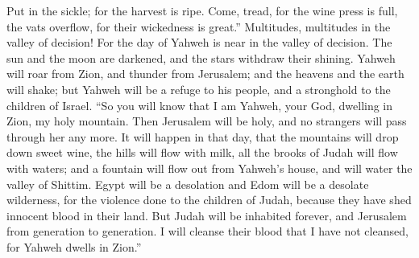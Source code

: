 Put in the sickle; for the harvest is ripe. Come, tread, for the wine
press is full, the vats overflow, for their wickedness is great.''
 Multitudes, multitudes in the valley of decision! For the
day of Yahweh is near in the valley of decision.  The sun
and the moon are darkened, and the stars withdraw their shining.
 Yahweh will roar from Zion, and thunder from Jerusalem;
and the heavens and the earth will shake; but Yahweh will be a refuge to
his people, and a stronghold to the children of Israel. 
``So you will know that I am Yahweh, your God, dwelling in Zion, my holy
mountain. Then Jerusalem will be holy, and no strangers will pass
through her any more.  It will happen in that day, that the
mountains will drop down sweet wine, the hills will flow with milk, all
the brooks of Judah will flow with waters; and a fountain will flow out
from Yahweh's house, and will water the valley of Shittim. 
Egypt will be a desolation and Edom will be a desolate wilderness, for
the violence done to the children of Judah, because they have shed
innocent blood in their land.  But Judah will be inhabited
forever, and Jerusalem from generation to generation.  I
will cleanse their blood that I have not cleansed, for Yahweh dwells in
Zion.''
